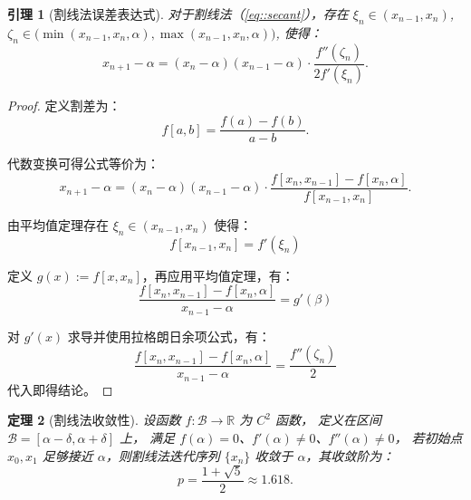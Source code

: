 \documentclass[a4paper]{ctexart}
\newtheorem{theorem}{定理}
\newtheorem{lemma}[theorem]{引理}
\numberwithin{theorem}{section}
\numberwithin{equation}{section}
\numberwithin{figure}{section}
\numberwithin{remark}{section}
\begin{document}
\begin{lemma}[割线法误差表达式]
    \label{lem::secant_error}
对于割线法（\ref{eq::secant}），存在 \( \xi_n \in (x_{n-1}, x_n) \), 
\( \zeta_n \in \big( \min(x_{n-1}, x_n, \alpha), \max(x_{n-1}, x_n, \alpha) \big) \), 使得：
\begin{equation}
x_{n+1} - \alpha = (x_n - \alpha)(x_{n-1} - \alpha) \cdot \frac{f''(\zeta_n)}{2 f'(\xi_n)}.
\end{equation}
\end{lemma}

\begin{proof}
定义割差为：
\begin{equation}
f[a,b] = \frac{f(a) - f(b)}{a - b}.
\end{equation}

代数变换可得公式等价为：
\begin{equation}
x_{n+1} - \alpha = (x_n - \alpha)(x_{n-1} - \alpha) \cdot \frac{f[x_n, x_{n-1}] - f[x_n, \alpha]}{f[x_{n-1}, x_n]}.
\end{equation}

由平均值定理存在 \( \xi_n \in (x_{n-1}, x_n) \) 使得：
\begin{equation}
f[x_{n-1}, x_n] = f'(\xi_n)
\end{equation}

定义 \( g(x) := f[x, x_n] \)，再应用平均值定理，有：
\begin{equation}
\frac{f[x_n, x_{n-1}] - f[x_n, \alpha]}{x_{n-1} - \alpha} = g'(\beta)
\end{equation}

对 \( g'(x) \) 求导并使用拉格朗日余项公式，有：
\begin{equation}
\frac{f[x_n, x_{n-1}] - f[x_n, \alpha]}{x_{n-1} - \alpha} = \frac{f''(\zeta_n)}{2}
\end{equation}
代入即得结论。
\end{proof}

\begin{theorem}[割线法收敛性]
    \label{thm::secant}
设函数 \( f : \mathcal{B} \to \mathbb{R} \) 为 \( C^2 \) 函数，
定义在区间 \( \mathcal{B} = [\alpha - \delta, \alpha + \delta] \) 上，
满足 \( f(\alpha) = 0 \)、\( f'(\alpha) \ne 0 \)、\( f''(\alpha) \ne 0 \)，
若初始点 \( x_0, x_1 \) 足够接近 \(\alpha\)，则割线法迭代序列 \( \{x_n\} \) 收敛于 \(\alpha\)，其收敛阶为：
\begin{equation*}
    \label{eq::golden_ratio}
p = \frac{1 + \sqrt{5}}{2} \approx 1.618.
\end{equation*}
\end{theorem}
\end{document}
